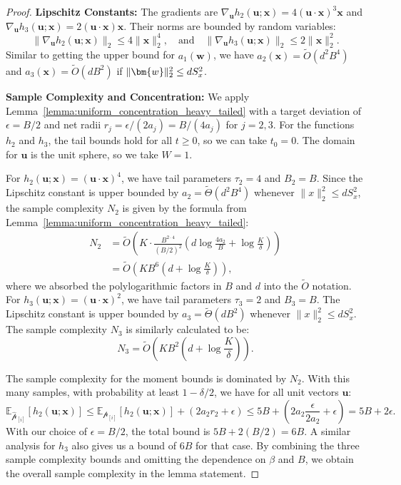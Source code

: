 \documentclass[11pt]{article}
\newcounter{thm}
\numberwithin{thm}{section}
\theoremstyle{plain}
\theoremstyle{definition}
\theoremstyle{remark} \newtheorem{remark}[thm]{Remark}
\def\vu{{\bm{u}}}
\def\vw{{\bm{w}}}
\def\vx{{\bm{x}}}
\def\ep{\widehat{\mathcal{p}}}
\def\pp{{\mathcal{p}}}
\newcommand{\E}{\mathbb{E}}
\DeclarePairedDelimiter\norm{\|}{\|}
\newcommand{\ppi}{{\pp_{[i]}}}
\newcommand{\epi}{\ep_{[i]}}
\begin{document}
\begin{proof}
\textbf{Lipschitz Constants:} The gradients are $\nabla_\vu h_2(\vu;\vx) = 4(\vu\cdot\vx)^3\vx$ and $\nabla_\vu h_3(\vu;\vx) = 2(\vu\cdot\vx)\vx$. Their norms are bounded by random variables:
\[
\|\nabla_\vu h_2(\vu;\vx)\|_2 \le 4\|\vx\|_2^4, \quad \text{and} \quad \|\nabla_\vu h_3(\vu;\vx)\|_2 \le 2\|\vx\|_2^2.
\]
Similar to getting the upper bound for \(a_1(\vw)\), we have $a_2(\vx) = \tilde{O}(d^2B^4)$ and $a_3(\vx) = \tilde{O}(d B^2)$ if \(\norm{\vw}_2^2\le dS_{x}^2\).

\textbf{Sample Complexity and Concentration:} 
We apply Lemma~\ref{lemma:uniform_concentration_heavy_tailed} with a target deviation of $\epsilon=B/2$ and net radii $r_j = \epsilon/(2a_j) = B/(4a_j)$ for \(j=2,3\). For the functions $h_2$ and $h_3$, the tail bounds hold for all $t \ge 0$, so we can take $t_0=0$. The domain for $\vu$ is the unit sphere, so we take $W=1$.

For $h_2(\vu;\vx) = (\vu\cdot\vx)^4$, we have tail parameters $\tau_2=4$ and $B_2=B$. Since the Lipschitz constant is upper bounded by $a_2 = \tilde{\Theta}(d^2 B^4)$ whenever $\|x\|_2^2 \leq d S_x^2$, the sample complexity $N_2$ is given by the formula from Lemma~\ref{lemma:uniform_concentration_heavy_tailed}:
\begin{align*}
    N_2 &=
\tilde{O}\left( K \cdot \frac{B^{2 \cdot 4}}{(B/2)^2}\left(d\log\frac{4a_2}{B} + \log\frac{K}{\delta}\right) \right) \\
&= \tilde{O}\left( K B^6 \left(d + \log\frac{K}{\delta}\right) \right),
\end{align*}
where we absorbed the polylogarithmic factors in $B$ and $d$ into the $\tilde{O}$ notation.
For $h_3(\vu;\vx) = (\vu\cdot\vx)^2$, we have tail parameters $\tau_3=2$ and $B_3=B$. The Lipschitz constant is upper bounded by $a_3 = \tilde{\Theta}(d B^2)$ whenever $\|x\|_2^2 \leq d S_x^2$. The sample complexity $N_3$ is similarly calculated to be:
\[
N_3 = \tilde{O}\left( K B^2 \left(d + \log\frac{K}{\delta}\right) \right).
\]

The sample complexity for the moment bounds is dominated by $N_2$. With this many samples, with probability at least $1-\delta/2$, we have for all unit vectors $\vu$:
\[
\E_{\epi}[h_2(\vu;\vx)] \le \E_{\ppi}[h_2(\vu;\vx)] + (2a_2r_2+\epsilon) \le 5B + \left(2a_2\frac{\epsilon}{2a_2}+\epsilon\right) = 5B + 2\epsilon.
\]
With our choice of $\epsilon = B/2$, the total bound is $5B + 2(B/2) = 6B$. A similar analysis for $h_3$ also gives us a bound of $6B$ for that case. By combining the three sample complexity bounds and omitting the dependence on 
\(\beta\) and \(B\), we obtain the overall sample complexity in the lemma statement.
\end{proof}
\end{document}
